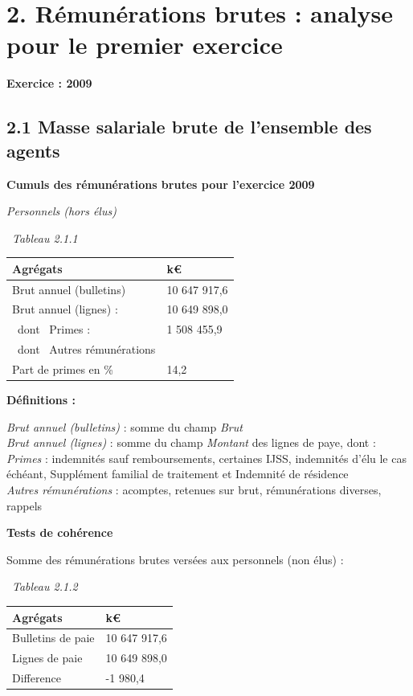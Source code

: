 \hypertarget{remunerations-brutes-analyse-pour-le-premier-exercice}{%
\section{2. Rémunérations brutes : analyse pour le premier
exercice}\label{remunerations-brutes-analyse-pour-le-premier-exercice}}

\textbf{Exercice : 2009 }

\hypertarget{masse-salariale-brute-de-lensemble-des-agents}{%
\subsection{2.1 Masse salariale brute de l'ensemble des
agents}\label{masse-salariale-brute-de-lensemble-des-agents}}

\textbf{Cumuls des rémunérations brutes pour l'exercice 2009 }

\emph{Personnels (hors élus)}

~\emph{Tableau 2.1.1}

\begin{longtable}[]{@{}ll@{}}
\toprule
Agrégats & k€\tabularnewline
\midrule
\endhead
Brut annuel (bulletins) & 10 647 917,6\tabularnewline
Brut annuel (lignes) : & 10 649 898,0\tabularnewline
~dont ~Primes : & 1 508 455,9\tabularnewline
~dont ~Autres rémunérations &\tabularnewline
Part de primes en \% & 14,2\tabularnewline
\bottomrule
\end{longtable}

\textbf{Définitions :}

\emph{Brut annuel (bulletins)} : somme du champ \emph{Brut}\\
\emph{Brut annuel (lignes)} : somme du champ \emph{Montant} des lignes
de paye, dont :\\
\emph{Primes} : indemnités sauf remboursements, certaines IJSS,
indemnités d'élu le cas échéant, Supplément familial de traitement et
Indemnité de résidence\\
\emph{Autres rémunérations} : acomptes, retenues sur brut, rémunérations
diverses, rappels

\textbf{Tests de cohérence}

Somme des rémunérations brutes versées aux personnels (non élus) :

~\emph{Tableau 2.1.2}

\begin{longtable}[]{@{}ll@{}}
\toprule
Agrégats & k€\tabularnewline
\midrule
\endhead
Bulletins de paie & 10 647 917,6\tabularnewline
Lignes de paie & 10 649 898,0\tabularnewline
Difference & -1 980,4\tabularnewline
\bottomrule
\end{longtable}

